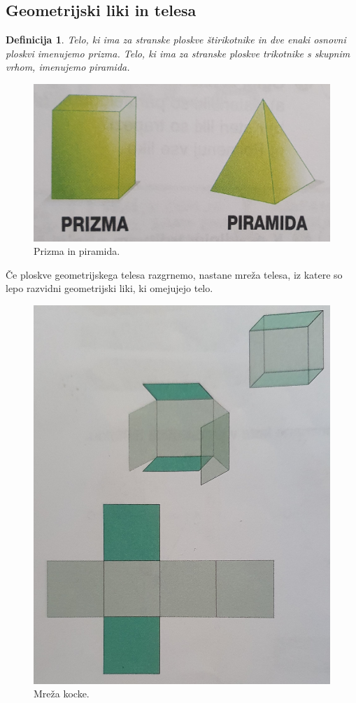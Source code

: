 \documentclass{article}
\newtheorem{definicija}{Definicija}[subsection]
\begin{document}
\pagebreak
\subsection{ Geometrijski liki in telesa }

\begin{definicija}
    Telo, ki ima za stranske ploskve štirikotnike in dve enaki osnovni ploskvi imenujemo prizma. Telo, ki ima za stranske ploskve trikotnike s skupnim vrhom, imenujemo piramida.
\end{definicija}

\begin{figure}[h]
    \includegraphics[width=0.7\linewidth]{prizmaInPiramida.png}
    \centering
    \caption{Prizma in piramida.}
\end{figure}

Če ploskve geometrijskega telesa razgrnemo, nastane mreža telesa, iz katere so lepo razvidni geometrijski liki, ki omejujejo telo.


\begin{figure}[h]
    \includegraphics[width=0.5\linewidth]{mrezaKocke.png}
    \centering
    \caption{Mreža kocke.}
\end{figure}
\end{document}
